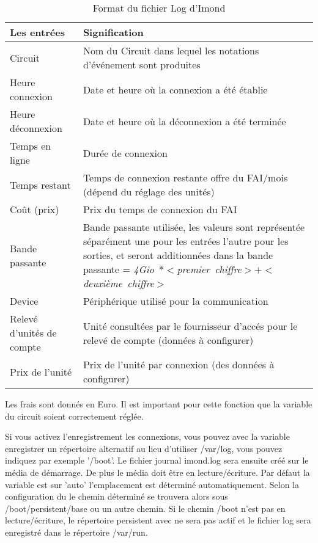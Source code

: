 \begin{description}
{      \begin{table}[htbp]
        \small
        \centering
        \caption{Format du fichier Log d'Imond}\label{tab:imondlog}
        \begin{tabular}{lp{12cm}}
          \hline
          Les entrées & Signification \\
          \hline
          Circuit & Nom du Circuit dans lequel les notations d'événement
          sont produites \\
          Heure connexion & Date et heure où la connexion a été établie \\
          Heure déconnexion & Date et heure où la déconnexion a été terminée \\
          Temps en ligne & Durée de connexion \\
          Temps restant & Temps de connexion restante offre du FAI/mois
          (dépend du réglage des unités) \\
          Coût (prix) & Prix du temps de connexion du FAI \\
          Bande passante & Bande passante utilisée, les valeurs sont
          représentée séparément une pour les entrées l'autre pour les sorties,
          et seront additionnées dans la bande passante =\newline
          \emph{4Gio~$*<$premier~chiffre$>+<$deuxième~chiffre$>$} \\
          Device & Périphérique utilisé pour la communication \\
          Relevé d'unités de compte & Unité consultées par le fournisseur
          d'accés pour le relevé de compte (données à configurer) \\
          Prix de l'unité & Prix de l'unité par connexion (des données à configurer) \\
          \hline
        \end{tabular}
      \end{table}

      Les frais sont donnés en Euro. Il est important pour cette fonction
      que la variable  du circuit
      soient correctement réglée.
    }


    {Si vous activez l'enregistrement les connexions, vous pouvez avec la variable
     enregistrer un répertoire alternatif au lieu d'utiliser
    /var/log, vous pouvez indiquez par exemple '/boot'. Le fichier journal
    imond.log sera ensuite créé sur le média de démarrage. De plus le média doit
    être en \flqq{}lecture/écriture\frqq{}. Par défaut la variable est sur 'auto'
    l'emplacement est déterminé automatiquement. Selon la configuration du 
    le chemin déterminé se trouvera alors sous /boot/persistent/base ou un autre
    chemin. Si le chemin /boot n'est pas en lecture/écriture, le répertoire
    persistent avec  ne sera pas actif et le fichier log sera
    enregistré dans le répertoire /var/run.}


\end{description}
